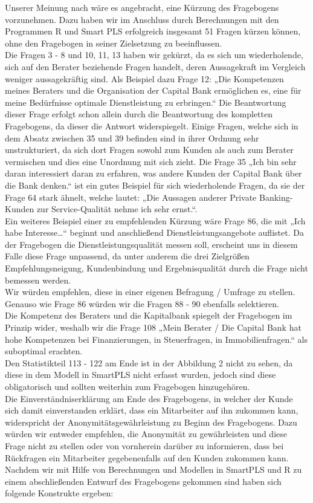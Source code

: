 \documentclass{article}\usepackage[]{graphicx}\usepackage[]{color}
\begin{document}

\label{fragebogen}


Unserer Meinung nach wäre es angebracht, eine Kürzung des Fragebogens vorzunehmen. Dazu haben wir im Anschluss durch Berechnungen mit den Programmen R und Smart PLS erfolgreich insgesamt 51 Fragen kürzen können, ohne den Fragebogen in seiner Zielsetzung zu beeinflussen.\\
Die Fragen 3 - 8 und 10, 11, 13 haben wir gekürzt, da es sich um wiederholende, sich auf den Berater beziehende Fragen handelt, deren Aussagekraft im Vergleich weniger aussagekräftig sind. Als Beispiel dazu Frage 12: „Die Kompetenzen meines Beraters und die Organisation der Capital Bank ermöglichen es, eine für meine Bedürfnisse optimale Dienstleistung zu erbringen.“ Die Beantwortung dieser Frage erfolgt schon allein durch die Beantwortung des kompletten Fragebogens, da dieser die Antwort widerspiegelt. Einige Fragen, welche sich in dem Absatz zwischen 35 und 39 befinden sind in ihrer Ordnung sehr unstrukturiert, da sich dort Fragen sowohl zum Kunden als auch zum Berater vermischen und dies eine Unordnung mit sich zieht. Die Frage 35 „Ich bin sehr daran interessiert daran zu erfahren, was andere Kunden der Capital Bank über die Bank denken.“ ist ein gutes Beispiel für sich wiederholende Fragen, da sie der Frage 64 stark ähnelt, welche lautet: „Die Aussagen anderer Private Banking-Kunden zur Service-Qualität nehme ich sehr ernst.“.\\
Ein weiteres Beispiel einer zu empfehlenden Kürzung wäre Frage 86, die mit „Ich habe Interesse…“ beginnt und anschließend Dienstleistungsangebote auflistet. Da der Fragebogen die Dienstleistungsqualität messen soll, erscheint uns in diesem Falle diese Frage unpassend, da unter anderem die drei Zielgrößen Empfehlungsneigung, Kundenbindung und Ergebnisqualität durch die Frage nicht bemessen werden.\\
Wir würden empfehlen, diese in einer eigenen Befragung / Umfrage zu stellen. Genauso wie Frage 86 würden wir die Fragen 88 - 90 ebenfalls selektieren.\\
Die Kompetenz des Beraters und die Kapitalbank spiegelt der Fragebogen im Prinzip wider, weshalb wir die Frage 108 „Mein Berater / Die Capital Bank hat hohe Kompetenzen bei Finanzierungen, in Steuerfragen, in Immobilienfragen.“ als suboptimal erachten.\\
Den Statistikteil 113 - 122 am Ende ist in der Abbildung 2 nicht zu sehen, da diese in dem Modell in SmartPLS nicht erfasst wurden, jedoch sind diese obligatorisch und sollten weiterhin zum Fragebogen hinzugehören.\\
Die Einverständniserklärung am Ende des Fragebogens, in welcher der Kunde sich damit einverstanden erklärt, dass ein Mitarbeiter auf ihn zukommen kann, widerspricht der Anonymitätsgewährleistung zu Beginn des Fragebogens. Dazu würden wir entweder empfehlen, die Anonymität zu gewährleisten und diese Frage nicht zu stellen oder von vornherein darüber zu informieren, dass bei Rückfragen ein Mitarbeiter gegebenenfalls auf den Kunden zukommen kann.\\
Nachdem wir mit Hilfe von Berechnungen und Modellen in SmartPLS und R zu einem abschließenden Entwurf des Fragebogens gekommen sind haben sich folgende Konstrukte ergeben:
\end{document}
